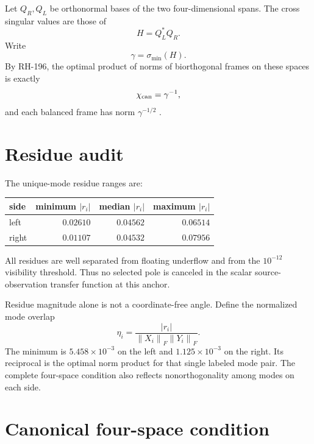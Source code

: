 \documentclass[12pt]{article}
\theoremstyle{remark}
\newcommand{\norm}[1]{\left\lVert#1\right\rVert}
\begin{document}
Let $Q_R,Q_L$ be orthonormal bases of the two four-dimensional spans.  The
cross singular values are those of
\begin{equation}\label{eq:cross}
 H=Q_L^*Q_R.
\end{equation}
Write
\begin{equation}\label{eq:gamma}
 \gamma=\sigma_{\min}(H).
\end{equation}
By RH-196, the optimal product of norms of biorthogonal frames on these
spaces is exactly
\begin{equation}\label{eq:condition}
 \chi_{\rm can}=\gamma^{-1},
\end{equation}
and each balanced frame has norm $\gamma^{-1/2}$
\citep{WangRH196}.

\section{Residue audit}

The unique-mode residue ranges are:
\begin{center}
\begin{tabular}{lrrr}
\toprule
side & minimum $|r_i|$ & median $|r_i|$ & maximum $|r_i|$\\
\midrule
left & $0.02610$ & $0.04562$ & $0.06514$\\
right & $0.01107$ & $0.04532$ & $0.07956$\\
\bottomrule
\end{tabular}
\end{center}
All residues are well separated from floating underflow and from the
$10^{-12}$ visibility threshold.  Thus no selected pole is canceled in the
scalar source-observation transfer function at this anchor.

Residue magnitude alone is not a coordinate-free angle.  Define the
normalized mode overlap
\begin{equation}\label{eq:mode-overlap}
 \eta_i=\frac{|r_i|}{\norm{X_i}_F\norm{Y_i}_F}.
\end{equation}
The minimum is $5.458\times10^{-3}$ on the left and
$1.125\times10^{-3}$ on the right.  Its reciprocal is the optimal norm
product for that single labeled mode pair.  The complete four-space
condition also reflects nonorthogonality among modes on each side.

\section{Canonical four-space condition}
\end{document}
